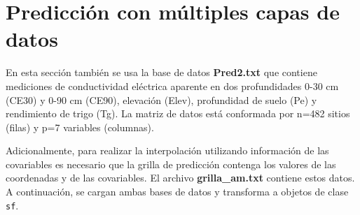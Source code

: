 \documentclass[11pt,b5paper,]{krantz}
\begin{document}
\hypertarget{predicciuxf3n-con-muxfaltiples-capas-de-datos-1}{%
\section{Predicción con múltiples capas de datos}\label{predicciuxf3n-con-muxfaltiples-capas-de-datos-1}}

En esta sección también se usa la base de datos \textbf{Pred2.txt} que contiene mediciones de conductividad eléctrica aparente en dos profundidades 0-30 cm (CE30) y 0-90 cm (CE90), elevación (Elev), profundidad de suelo (Pe) y rendimiento de trigo (Tg). La matriz de datos está conformada por n=482 sitios (filas) y p=7 variables (columnas).

Adicionalmente, para realizar la interpolación utilizando información de las covariables es necesario que la grilla de predicción contenga los valores de las coordenadas y de las covariables. El archivo \textbf{grilla\_am.txt} contiene estos datos. A continuación, se cargan ambas bases de datos y transforma a objetos de clase \texttt{sf}.
\end{document}
